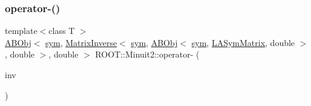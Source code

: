 \subsubsection{\texorpdfstring{operator-\/()}{operator-()}\hspace{0.1cm}{\footnotesize\ttfamily [1/4]}}
{\footnotesize\ttfamily template$<$class T $>$ \\
\mbox{\hyperlink{classROOT_1_1Minuit2_1_1ABObj}{A\+B\+Obj}}$<$ \mbox{\hyperlink{classROOT_1_1Minuit2_1_1sym}{sym}}, \mbox{\hyperlink{classROOT_1_1Minuit2_1_1MatrixInverse}{Matrix\+Inverse}}$<$ \mbox{\hyperlink{classROOT_1_1Minuit2_1_1sym}{sym}}, \mbox{\hyperlink{classROOT_1_1Minuit2_1_1ABObj}{A\+B\+Obj}}$<$ \mbox{\hyperlink{classROOT_1_1Minuit2_1_1sym}{sym}}, \mbox{\hyperlink{classROOT_1_1Minuit2_1_1LASymMatrix}{L\+A\+Sym\+Matrix}}, double $>$, double $>$, double $>$ R\+O\+O\+T\+::\+Minuit2\+::operator-\/ (\begin{DoxyParamCaption}\item[{const \mbox{\hyperlink{classROOT_1_1Minuit2_1_1ABObj}{A\+B\+Obj}}$<$ \mbox{\hyperlink{classROOT_1_1Minuit2_1_1sym}{sym}}, \mbox{\hyperlink{classROOT_1_1Minuit2_1_1MatrixInverse}{Matrix\+Inverse}}$<$ \mbox{\hyperlink{classROOT_1_1Minuit2_1_1sym}{sym}}, \mbox{\hyperlink{classROOT_1_1Minuit2_1_1ABObj}{A\+B\+Obj}}$<$ \mbox{\hyperlink{classROOT_1_1Minuit2_1_1sym}{sym}}, \mbox{\hyperlink{classROOT_1_1Minuit2_1_1LASymMatrix}{L\+A\+Sym\+Matrix}}, double $>$, double $>$, double $>$ \&}]{inv }\end{DoxyParamCaption})\hspace{0.3cm}{\ttfamily [inline]}}

\mbox{\label{namespaceROOT_1_1Minuit2_acef6728c8c24759479f97a32d56544f1}} 
